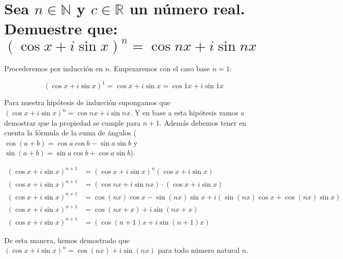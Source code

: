 \documentclass{report}
\begin{document}
    \section{Sea $n \in \mathbb{N}$ y $c \in \mathbb{R}$ un número real. Demuestre que: $(\cos x + i\sin x)^n = \cos nx + i\sin nx$}

    Procederemos por inducción en $n$. Empezaremos con el caso base $n = 1$:

    \[
    (\cos x + i\sin x)^1 = \cos x + i\sin x = \cos 1x + i\sin 1x
    \]

    \noindent Para nuestra hipótesis de inducción supongamos que $(\cos x + i\sin x)^n = \cos nx + i\sin nx$. Y en base a esta hipótesis vamos a demostrar que la propiedad se cumple para $n +1$. Además debemos tener en cuenta la fórmula de la suma de ángulos ($\cos(a+b) = \cos a \cos b - \sin a \sin b$ y $\sin(a+b) = \sin a \cos b + \cos a \sin b$).

    \begin{center}
        \begin{align*}
            (\cos x + i\sin x)^{n+1} &= (\cos x + i\sin x)^n(\cos x + i\sin x) \\
            (\cos x + i\sin x)^{n+1} &= (\cos nx + i\sin nx) \cdot (\cos x + i\sin x) \\
            (\cos x + i\sin x)^{n+1} &= \cos(nx)\cos x - \sin(nx)\sin x + i(\sin(nx)\cos x + \cos(nx)\sin x)\\
            (\cos x + i\sin x)^{n+1} &= \cos(nx + x) + i\sin(nx + x)\\
            (\cos x + i\sin x)^{n+1} &= (\cos (n+1)x + i\sin (n+1)x)
        \end{align*}
    \end{center}

    De esta manera, hemos demostrado que $(\cos x + i\sin x)^n = \cos(nx) + i\sin(nx)$ para todo número natural $n$.
\end{document}
